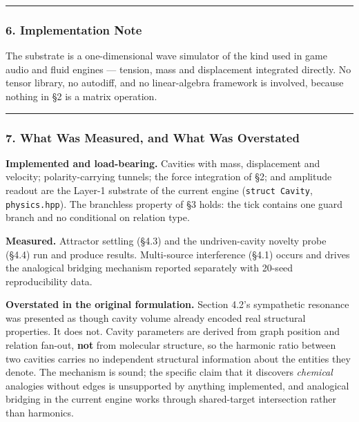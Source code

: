 \documentclass[
  11pt,
  a4paper,
]{article}
\begin{document}
\begin{center}\rule{0.5\linewidth}{0.5pt}\end{center}

\subsubsection{6. Implementation Note}\label{implementation-note}

The substrate is a one-dimensional wave simulator of the kind used in
game audio and fluid engines --- tension, mass and displacement
integrated directly. No tensor library, no autodiff, and no
linear-algebra framework is involved, because nothing in §2 is a matrix
operation.

\begin{center}\rule{0.5\linewidth}{0.5pt}\end{center}

\subsubsection{7. What Was Measured, and What Was
Overstated}\label{what-was-measured-and-what-was-overstated}

\textbf{Implemented and load-bearing.} Cavities with mass, displacement
and velocity; polarity-carrying tunnels; the force integration of §2;
and amplitude readout are the Layer-1 substrate of the current engine
(\texttt{struct\ Cavity}, \texttt{physics.hpp}). The branchless property
of §3 holds: the tick contains one guard branch and no conditional on
relation type.

\textbf{Measured.} Attractor settling (§4.3) and the undriven-cavity
novelty probe (§4.4) run and produce results. Multi-source interference
(§4.1) occurs and drives the analogical bridging mechanism reported
separately with 20-seed reproducibility data.

\textbf{Overstated in the original formulation.} Section 4.2's
sympathetic resonance was presented as though cavity volume already
encoded real structural properties. It does not. Cavity parameters are
derived from graph position and relation fan-out, \textbf{not} from
molecular structure, so the harmonic ratio between two cavities carries
no independent structural information about the entities they denote.
The mechanism is sound; the specific claim that it discovers
\emph{chemical} analogies without edges is unsupported by anything
implemented, and analogical bridging in the current engine works through
shared-target intersection rather than harmonics.
\end{document}
